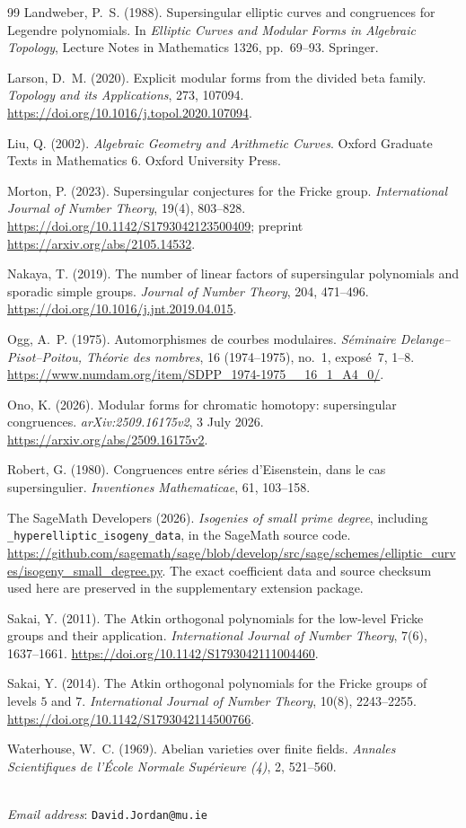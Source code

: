 \documentclass[11pt,a4paper]{article}
\numberwithin{equation}{section}
\theoremstyle{definition}
\theoremstyle{remark}
\begin{document}
\begin{thebibliography}{99}
 Landweber, P.~S. (1988). Supersingular elliptic curves and congruences for Legendre polynomials. In \emph{Elliptic Curves and Modular Forms in Algebraic Topology}, Lecture Notes in Mathematics 1326, pp.~69--93. Springer.

 Larson, D.~M. (2020). Explicit modular forms from the divided beta family. \emph{Topology and its Applications}, 273, 107094. \url{https://doi.org/10.1016/j.topol.2020.107094}.

 Liu, Q. (2002). \emph{Algebraic Geometry and Arithmetic Curves}. Oxford Graduate Texts in Mathematics 6. Oxford University Press.


 Morton, P. (2023). Supersingular conjectures for the
Fricke group. \emph{International Journal of Number Theory}, 19(4), 803--828.
\url{https://doi.org/10.1142/S1793042123500409}; preprint
\url{https://arxiv.org/abs/2105.14532}.

 Nakaya, T. (2019). The number of linear factors of
supersingular polynomials and sporadic simple groups. \emph{Journal of Number Theory},
204, 471--496. \url{https://doi.org/10.1016/j.jnt.2019.04.015}.


 Ogg, A.~P. (1975).
Automorphismes de courbes modulaires.
\emph{S\'eminaire Delange--Pisot--Poitou, Th\'eorie des nombres},
16 (1974--1975), no.~1, expos\'e~7, 1--8.
\url{https://www.numdam.org/item/SDPP_1974-1975__16_1_A4_0/}.

 Ono, K. (2026). Modular forms for chromatic homotopy: supersingular congruences. \emph{arXiv:2509.16175v2}, 3 July 2026. \url{https://arxiv.org/abs/2509.16175v2}.


 Robert, G. (1980). Congruences entre s\'eries d'Eisenstein, dans le cas supersingulier. \emph{Inventiones Mathematicae}, 61, 103--158.

 The SageMath Developers (2026).
\emph{Isogenies of small prime degree}, including
\texttt{\_hyperelliptic\_isogeny\_data}, in the SageMath source code.
\url{https://github.com/sagemath/sage/blob/develop/src/sage/schemes/elliptic_curves/isogeny_small_degree.py}.
The exact coefficient data and source checksum used here are preserved
in the supplementary extension package.

 Sakai, Y. (2011). The Atkin orthogonal polynomials for
the low-level Fricke groups and their application.
\emph{International Journal of Number Theory}, 7(6), 1637--1661.
\url{https://doi.org/10.1142/S1793042111004460}.

 Sakai, Y. (2014). The Atkin orthogonal polynomials for
the Fricke groups of levels $5$ and $7$.
\emph{International Journal of Number Theory}, 10(8), 2243--2255.
\url{https://doi.org/10.1142/S1793042114500766}.

 Waterhouse, W.~C. (1969). Abelian varieties over finite fields. \emph{Annales Scientifiques de l'\'Ecole Normale Sup\'erieure (4)}, 2, 521--560.
\end{thebibliography}
	\bigskip
{}\\
\emph{Email address}: \texttt{David.Jordan@mu.ie}
\end{document}
